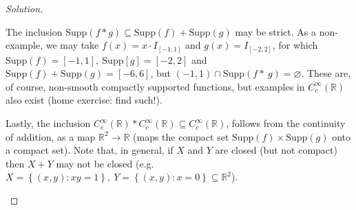 \documentclass[12pt, draft,reqno,a4paper, twoside]{amsproc}
\newcommand{\supp}{\mathrm{Supp}}
\renewcommand{\O}{\varnothing}
\newcommand{\dbR}{\mathbb R}
\newcommand{\set}[1]{\left\{{#1}\right\}}
\newcommand{\abs}[1]{\left|#1\right|}
\begin{document}
\begin{proof}[\it Solution]
\begin{enumerate}
The inclusion $\supp(f\ast g)\subseteq\supp(f)+\supp(g)$ may be strict. As a non-example, we may take $f(x)=x\cdot I_{[-1,1]}$ and $g(x)=I_{[-2,2]}$, for which $\supp(f)=[-1,1],\:\supp[g]=[-2,2]$ and $\supp(f)+\supp(g)=[-6,6]$, but $(-1,1)\cap\supp(f\ast~ g)=\O$. These are, of course, non-smooth compactly supported functions, but examples in $C_c^\infty(\dbR)$ also exist (home exercise: find such!). 

Lastly, the inclusion $C_c^\infty(\dbR)\ast C_c^\infty(\dbR)\subseteq C_c^\infty(\dbR)$, follows from the continuity of addition, as a map $\dbR^2\to\dbR$ (maps the compact set $\supp(f)\times\supp (g)$ onto a compact set). Note that, in general, if $X$ and $Y$ are closed (but not compact) then $X+Y$ may not be closed (e.g. $X=\set{(x,y):xy=1},\:Y=\set{(x,y):x=0}\subseteq\dbR^2$).
\end{enumerate}
\end{proof}
\end{document}
